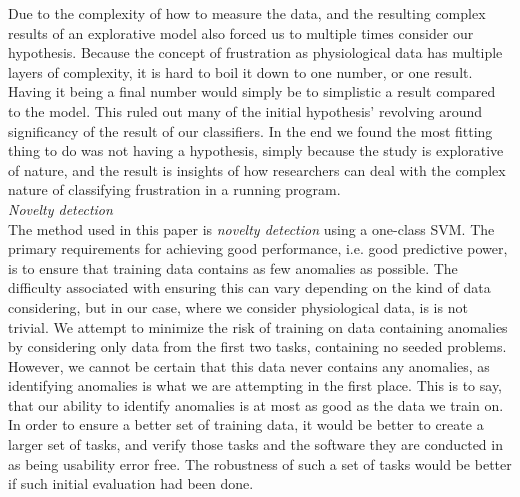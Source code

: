 Due to the complexity of how to measure the data, and the resulting complex results of an explorative model also forced us to multiple times consider our hypothesis. Because the concept of frustration as physiological data has multiple layers of complexity, it is hard to boil it down to one number, or one result. Having it being a final number would simply be to simplistic a result compared to the model. This ruled out many of the initial hypothesis' revolving around significancy of the result of our classifiers. In the end we found the most fitting thing to do was not having a hypothesis, simply because the study is explorative of nature, and the result is insights of how researchers can deal with the complex nature of classifying frustration in a running program.\\

\textit{Novelty detection}\\
The method used in this paper is \textit{novelty detection} using a one-class SVM. The primary requirements for
achieving good performance, i.e. good predictive power, is to ensure that training data contains as few anomalies as
possible. The difficulty associated with ensuring this can vary depending on the kind of data considering, but in our
case, where we consider physiological data, is is not trivial. We attempt to minimize the risk of
training on data containing anomalies by considering only data from the first two tasks, containing no seeded
problems. However, we cannot be certain that this data never contains any anomalies, as identifying anomalies is what we
are attempting in the first place. This is to say, that our ability to identify anomalies is at most as good as the data
we train on. In order to ensure a better set of training data, it would be better to create a larger set of tasks, and verify those tasks and the software they are conducted in as being usability error free. 
The robustness of such a set of tasks would be better if such initial evaluation had been done.

